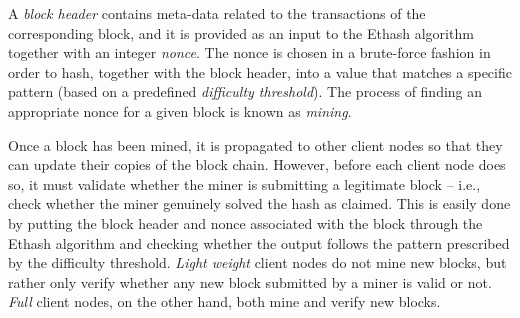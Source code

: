 \documentclass[runningheads]{llncs}
\begin{document}
A \emph{block header} contains meta-data related to the transactions of the corresponding block, and it is provided as an input to the Ethash algorithm together with an integer \emph{nonce}.  The nonce is chosen in a brute-force fashion in order to hash, together with the block header, into a value that matches a specific pattern (based on a predefined \emph{difficulty threshold}). The process of finding an appropriate nonce for a given block is known as \emph{mining}.

Once a block has been mined, it is propagated to other client nodes so that they can update their copies of the block chain. However, before each client node does so, it must validate whether the miner is submitting a legitimate block -- i.e., check whether the miner genuinely solved the hash as claimed. This is easily done by putting the block header and nonce associated with the block through the Ethash algorithm and checking whether the output follows the pattern prescribed by the difficulty threshold.  \emph{Light weight} client nodes do not mine new blocks, but rather only verify whether any new block submitted by a miner is valid or not.  \emph{Full} client nodes, on the other hand, both mine and verify new blocks.
\end{document}
